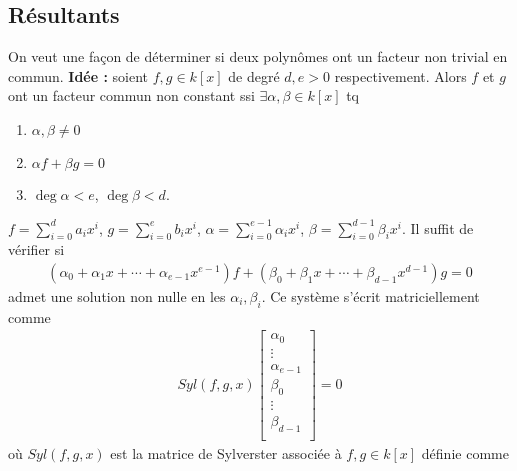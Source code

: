         \subsection{Résultants}
            On veut une façon de déterminer si deux polynômes ont un facteur non trivial en commun. \textbf{Idée :} soient $f,g \in k[x]$ de degré $d,e > 0$ respectivement. Alors $f$ et $g$ ont un facteur commun non constant ssi $\exists \alpha, \beta \in k[x]$ tq 
            \begin{enumerate}
                \item $\alpha, \beta \neq 0$
                \item $\alpha f + \beta g = 0$
                \item $\deg \alpha < e$, $\deg \beta < d$.
            \end{enumerate}
            $f = \sum_{i = 0}^d a_ix^i$, $g = \sum_{i = 0}^e b_i x^i$, $\alpha = \sum_{i = 0}^{e-1} \alpha_i x^i$, $\beta = \sum_{i = 0}^{d-1} \beta_i x^i$. Il suffit de vérifier si
            \begin{align*}
                (\alpha_0 + \alpha_1x + \cdots + \alpha_{e-1}x^{e-1})f + (\beta_0 + \beta_1x + \cdots + \beta_{d-1}x^{d-1})g = 0
            \end{align*}
            admet une solution non nulle en les $\alpha_i, \beta_i$. Ce système s'écrit matriciellement comme 
            \begin{align*}
                Syl(f,g,x) 
                \begin{bmatrix}
                    \alpha_0 \\
                    \vdots \\
                    \alpha_{e - 1} \\
                    \beta_0 \\
                    \vdots \\
                    \beta_{d - 1} \\
                \end{bmatrix} = 0
            \end{align*}
            où $Syl(f, g, x)$ est la matrice de Sylverster associée à $f, g \in k[x]$ définie comme
